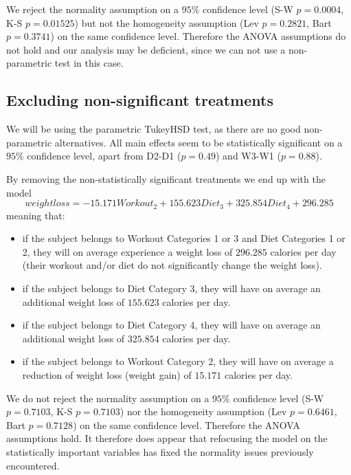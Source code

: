 \documentclass[12pt, a4paper]{article}
\begin{document}
	We reject the normality assumption on a $95\%$ confidence level (S-W $p=0.0004$, K-S $p=0.01525$) but not the homogeneity assumption (Lev $p=0.2821$, Bart $p=0.3741$) on the same confidence level. Therefore the ANOVA assumptions do not hold and our analysis may be deficient, since we can not use a non-parametric test in this case.
	
	
	
	
	\subsection{Excluding non-significant treatments}
	We will be using the parametric TukeyHSD test, as there are no good non-parametric alternatives. All main effects seem to be statistically significant on a $95\%$ confidence level, apart from D2-D1 ($p=0.49$) and W3-W1 ($p=0.88$).
	
	By removing the non-statistically significant treatments we end up with the model 
	$$
	weightloss = -15.171 Workout_2 + 155.623 Diet_3 + 325.854 Diet_4 + 296.285 
	$$ 
	meaning that:
	
	\begin{itemize}
		\item if the subject belongs to Workout Categories 1 or 3 and Diet Categories 1 or 2, they will on average experience a weight loss of $296.285$ calories per day (their workout and/or diet do not significantly change the weight loss). 
		
		\item if the subject belongs to Diet Category 3, they will have on average an additional weight loss of $155.623$ calories per day.
		
		\item if the subject belongs to Diet Category 4, they will have on average an additional weight loss of $325.854$ calories per day.
		
		\item if the subject belongs to Workout Category 2, they will have on average a reduction of weight loss (weight gain) of $15.171$ calories per day.

	\end{itemize}
	
	We do not reject the normality assumption on a $95\%$ confidence level (S-W $p=0.7103$, K-S $p=0.7103$) nor the homogeneity assumption (Lev $p=0.6461$, Bart $p=0.7128$) on the same confidence level. Therefore the ANOVA assumptions hold. It therefore does appear that refocusing the model on the statistically important variables has fixed the normality issues previously encountered.
	
\end{document}
